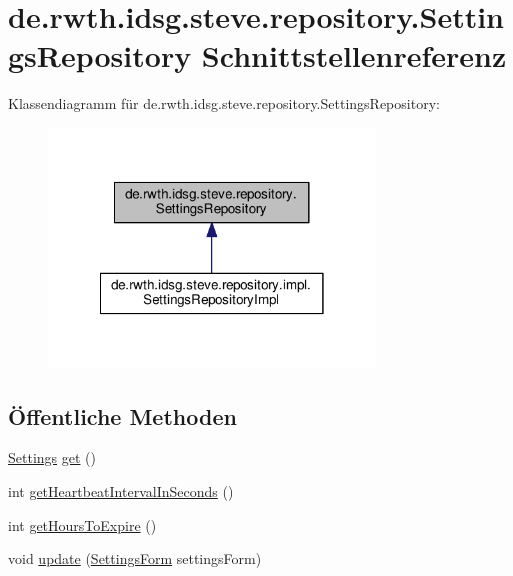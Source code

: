 \hypertarget{interfacede_1_1rwth_1_1idsg_1_1steve_1_1repository_1_1_settings_repository}{\section{de.\-rwth.\-idsg.\-steve.\-repository.\-Settings\-Repository Schnittstellenreferenz}
\label{interfacede_1_1rwth_1_1idsg_1_1steve_1_1repository_1_1_settings_repository}
}


Klassendiagramm für de.\-rwth.\-idsg.\-steve.\-repository.\-Settings\-Repository\-:\nopagebreak
\begin{figure}[H]
\begin{center}
\leavevmode
\includegraphics[width=246pt]{interfacede_1_1rwth_1_1idsg_1_1steve_1_1repository_1_1_settings_repository__inherit__graph}
\end{center}
\end{figure}
\subsection*{Öffentliche Methoden}
\begin{DoxyCompactItemize}
\item 
\hyperlink{classde_1_1rwth_1_1idsg_1_1steve_1_1repository_1_1dto_1_1_settings}{Settings} \hyperlink{interfacede_1_1rwth_1_1idsg_1_1steve_1_1repository_1_1_settings_repository_a35295ba80549c28f08021b9c990896cf}{get} ()
\item 
int \hyperlink{interfacede_1_1rwth_1_1idsg_1_1steve_1_1repository_1_1_settings_repository_adc44ee53b043441a6034598b5b3df2c9}{get\-Heartbeat\-Interval\-In\-Seconds} ()
\item 
int \hyperlink{interfacede_1_1rwth_1_1idsg_1_1steve_1_1repository_1_1_settings_repository_a05dee682f55826f6fc1e29c0ad9928cf}{get\-Hours\-To\-Expire} ()
\item 
void \hyperlink{interfacede_1_1rwth_1_1idsg_1_1steve_1_1repository_1_1_settings_repository_af7ca38a419b1cd8376322c43a4da61a7}{update} (\hyperlink{classde_1_1rwth_1_1idsg_1_1steve_1_1web_1_1dto_1_1_settings_form}{Settings\-Form} settings\-Form)
\end{DoxyCompactItemize}


